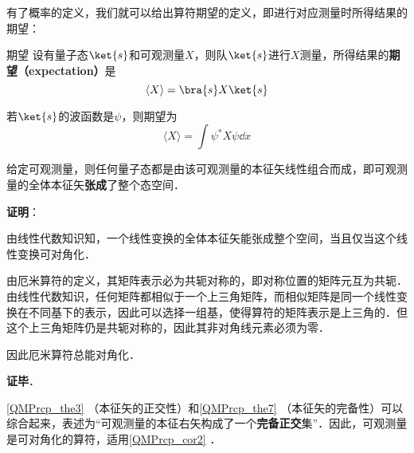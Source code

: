 有了概率的定义，我们就可以给出算符期望的定义，即进行对应测量时所得结果的期望：
\begin{definition}{期望}\label{QMPrcp_def18}
设有量子态$\ket{s}$和可观测量$X$，则队$\ket{s}$进行$X$测量，所得结果的\textbf{期望（expectation）}是
\begin{equation}
\langle X \rangle = \bra{s}X\ket{s}
\end{equation}

若$\ket{s}$的波函数是$\psi$，则期望为
\begin{equation}
\langle X \rangle  = \int \psi^* X \psi \dd x
\end{equation}

\end{definition}


\begin{theorem}{}\label{QMPrcp_the7}
给定可观测量，则任何量子态都是由该可观测量的本征矢线性组合而成，即可观测量的全体本征矢\textbf{张成}了整个态空间．
\end{theorem}

\textbf{证明}：

由线性代数知识知，一个线性变换的全体本征矢能张成整个空间，当且仅当这个线性变换可对角化．

由厄米算符的定义，其矩阵表示必为共轭对称的，即对称位置的矩阵元互为共轭．由线性代数知识，任何矩阵都相似于一个上三角矩阵，而相似矩阵是同一个线性变换在不同基下的表示，因此可以选择一组基，使得算符的矩阵表示是上三角的．但这个上三角矩阵仍是共轭对称的，因此其非对角线元素必须为零．

因此厄米算符总能对角化．

\textbf{证毕}．


\autoref{QMPrcp_the3} （本征矢的正交性）和\autoref{QMPrcp_the7} （本征矢的完备性）可以综合起来，表述为“可观测量的本征右矢构成了一个\textbf{完备正交}集”．因此，可观测量是可对角化的算符，适用\autoref{QMPrcp_cor2} ．










